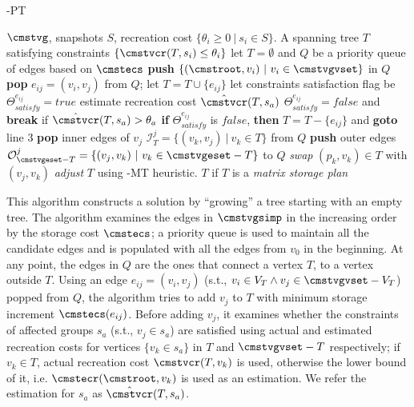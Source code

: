 \documentclass[conference]{IEEEtran}
\begin{document}
\begin{algorithm}[t!] 
\caption{\weightstore-PT}
\label{alg:pas_pt}{\small{
\begin{algorithmic}[1]
\REQUIRE $\cmstvg$, snapshots $S$, recreation cost $\{\theta_i \geq 0\ |\ s_i \in S\}$.
\ENSURE A spanning tree $T$ satisfying constraints $\{\cmstvcr(T, s_i) \leq \theta_i\}$
\STATE let $T = \emptyset$ and $Q$ be a priority queue of edges based on $\cmstecs$
\STATE \textbf{push} $\{(\cmstroot, v_i)\ |\ v_i \in \cmstvgvset\} $ in $Q$
\STATE \textbf{pop} $e_{ij} = (v_i, v_j)$ from $Q$; let $T = T \cup \{e_{ij}\}$
\STATE let constraints satisfaction flag be $\Theta^{e_{ij}}_{satisfy} = true$
\STATE estimate recreation cost $\hat\cmstvcr(T, s_a)$%
\STATE $\Theta^{e_{ij}}_{satisfy} = false$ and \textbf{break} if $\hat\cmstvcr(T, s_a) > \theta_a$
\ENDFOR
\STATE \textbf{if} $\Theta^{e_{ij}}_{satisfy}$ is $false$, \textbf{then} $T = T - \{e_{ij}\}$ and \textbf{goto} line 3
\STATE \textbf{pop} inner edges of $v_j$ $\mathcal{I}^j_T = \{(v_k, v_j)\ |\ v_k \in T\}$ from $Q$
\STATE \textbf{push} outer edges $\mathcal{O}^j_{\cmstvgeset - T} = \{(v_j, v_k)\ |\ v_k \in \cmstvgeset - T\}$ to $Q$
\STATE \emph{swap} $(p_k, v_k) \in T$ with $(v_j, v_k)$
\ENDFOR
\ENDWHILE
{}
\STATE \emph{adjust} $T$ using \weightstore-MT heuristic. 
\ENDIF
\RETURN $T$ if $T$ is a \emph{matrix storage plan}
\end{algorithmic}
}}
\end{algorithm}

This algorithm constructs a solution by ``growing'' a tree starting with an empty tree.
The algorithm examines the edges in $\cmstvgsimp$ in the increasing order by the storage cost $\cmstecs$; a priority
queue is used to maintain all the candidate edges and is populated with all the edges from $v_0$ in the beginning. 
At any point, the edges in $Q$ are the ones that connect a vertex $T$, to a vertex outside $T$.
Using an edge $e_{ij} = (v_i, v_j)$ (s.t., $v_i \in V_T \wedge v_j \in \cmstvgvset-V_T$) popped from $Q$, the algorithm
tries to add $v_j$ to $T$ with minimum storage increment $\cmstecs(e_{ij})$.
Before adding $v_j$, it examines whether the constraints of affected groups $s_a$ (s.t., $v_j \in s_a$) are satisfied 
using actual and estimated recreation costs
for vertices $\{v_k \in s_a\}$ in $T$ and $\cmstvgvset-T$ respectively; if $v_k
\in T$, actual recreation cost $\cmstvcr(T, v_k)$ is used, otherwise the lower
bound of it, i.e. $\cmstecr(\cmstroot, v_k)$ is used as an estimation. We refer
the estimation for $s_a$ as $\hat\cmstvcr(T, s_a)$. 
\end{document}
